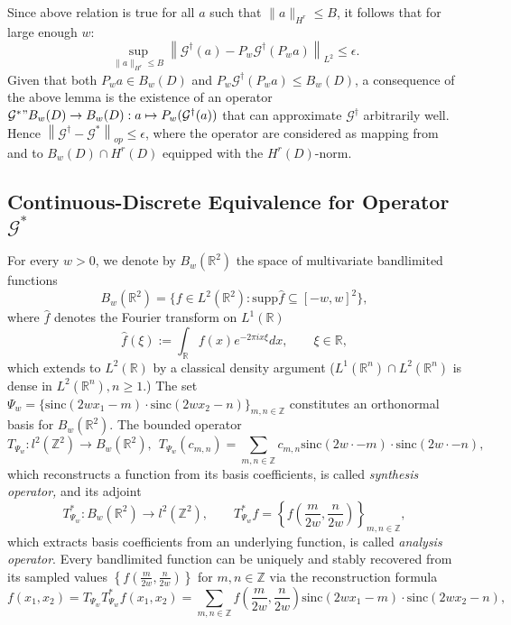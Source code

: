 \documentclass[reqno,10pt]{amsart}
\theoremstyle{plain}
\newcommand{\sinc}{\text{sinc}}
\theoremstyle{definition}
\newcommand{\bb}[1]{\mathbb{#1}}
\newcommand{\cal}[1]{\mathcal{#1}}
\begin{document}
    Since above relation is true for all $a$ such that $\|a\|_{H^r} \leq B$, it follows that for large enough $w$:
    \begin{equation}
        \sup\limits_{\|a\|_{H^r}\leq B} \left\|\cal G^\dag(a) - P_w\cal G^\dag(P_wa)\right\|_{L^2} \leq \epsilon.
    \end{equation}
    Given that both $P_wa \in B_w(D)$ and $P_w\cal G^\dag(P_wa) \leq B_w(D)$, a consequence of the above lemma is the existence of an operator $\cal G^* " B_w(D) \to B_w(D):a \mapsto P_w(\cal G^\dag(a))$ that can approximate $\cal G^\dag$ arbitrarily well. Hence $\left\|\cal G^\dag - \cal G^*\right\|_{op} \leq \epsilon$, where the operator are considered as mapping from and to $B_w(D) \cap H^r(D)$ equipped with the $H^r(D)$-norm.

    \subsection{Continuous-Discrete Equivalence for Operator \texorpdfstring{$\cal G^*$}{}} \label{appendix:A.2}
    For every $w > 0$, we denote by $B_w(\bb R^2)$ the space of multivariate bandlimited functions
    $$B_w(\bb R^2) = \{f \in L^2(\bb R^2) : \text{supp}\hat{f} \subseteq [-w,w]^2\},$$
    where $\hat{f}$ denotes the Fourier transform on $L^1(\bb R)$ 
    $$ \hat{f}(\xi) := \int_{\bb R}f(x) e^{-2\pi ix\xi} dx, \qquad \xi \in \bb R,$$
    which extends to $L^2(\bb R)$ by a classical density argument ($L^1(\bb R^n) \cap L^2(\bb R^n)$ is dense in $L^2(\bb R^n), n \geq 1$.) The set $\Psi_w = \{\sinc(2wx_1 - m) \cdot \sinc(2wx_2 - n)\}_{m,n \in \bb Z}$ constitutes an orthonormal basis for $B_w(\bb R^2)$. The bounded operator
    $$ T_{\Psi_w} :l^2(\bb Z^2) \to B_w(\bb R^2), ~~ T_{\Psi_w}(c_{m,n}) = \sum_{m,n\in \bb Z} c_{m,n} \sinc(2w\cdot - m)\cdot \sinc(2w\cdot -n),$$
    which reconstructs a function from its basis coefficients, is called {\it synthesis operator,} and its adjoint 
    $$ T^*_{\Psi_w} : B_w(\bb R^2) \to l^2(\bb Z^2), \qquad T^*_{\Psi_w} f = \left\{f\left(\frac{m}{2w},\frac{n}{2w}\right)\right\}_{m,n \in \bb Z},$$
    which extracts basis coefficients from an underlying function, is called {\it analysis operator}.  Every bandlimited function can be uniquely and stably recovered from its sampled values $\left\{f\left(\frac{m}{2w},\frac{n}{2w}\right)\right\}$ for ${m,n \in \bb Z}$ via the reconstruction formula
    \begin{equation}
        f(x_1,x_2) = T_{\Psi_w}T^*_{\Psi_w}f(x_1,x_2) = \sum\limits_{m,n \in \bb Z} f\left(\frac{m}{2w},\frac{n}{2w}\right) \sinc(2wx_1 - m) \cdot \sinc(2wx_2 - n),
    \end{equation}
\end{document}
